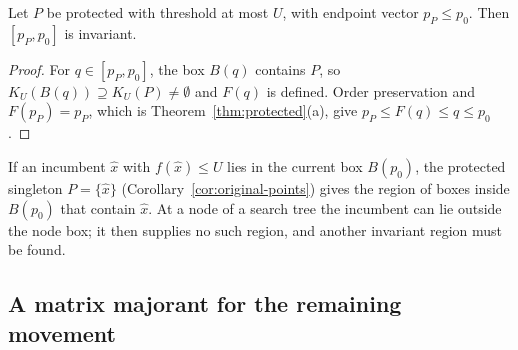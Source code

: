 \begin{lemma}\label{lem:invariant-interval}
Let $P$ be protected with threshold at most $U$, with endpoint vector
$p_P\le p_0$. Then $[p_P,p_0]$ is invariant.
\end{lemma}
\begin{proof}
For $q\in[p_P,p_0]$, the box $B(q)$ contains $P$, so
$K_U(B(q))\supseteq K_U(P)\ne\emptyset$ and $F(q)$ is defined. Order
preservation and $F(p_P)=p_P$, which is Theorem~\ref{thm:protected}(a),
give $p_P\le F(q)\le q\le p_0$.
\end{proof}

If an incumbent $\hat x$ with $f(\hat x)\le U$ lies in the current box
$B(p_0)$, the protected singleton $P=\{\hat x\}$
(Corollary~\ref{cor:original-points}) gives the region of boxes inside
$B(p_0)$ that contain $\hat x$. At a node of a search tree the incumbent
can lie outside the node box; it then supplies no such region, and
another invariant region must be found.

\subsection{A matrix majorant for the remaining movement}\label{sec:residual-tail}

